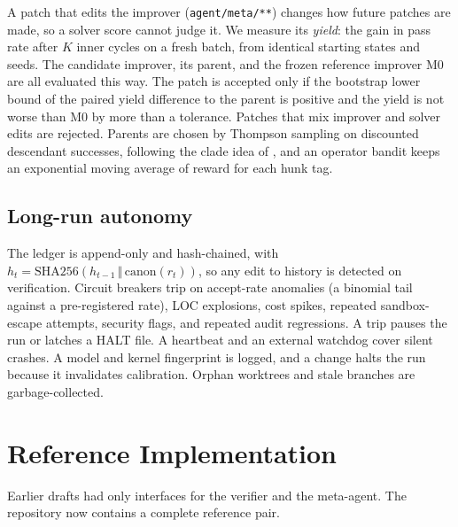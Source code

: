 \documentclass[11pt]{article}
\begin{document}
A patch that edits the improver (\texttt{agent/meta/**}) changes how future patches are made, so a solver score cannot judge it. We measure its \emph{yield}: the gain in pass rate after $K$ inner cycles on a fresh batch, from identical starting states and seeds.
The candidate improver, its parent, and the frozen reference improver M0 are all evaluated this way. The patch is accepted only if the bootstrap lower bound of the paired yield difference to the parent is positive and the yield is not worse than M0 by more than a tolerance.
Patches that mix improver and solver edits are rejected. Parents are chosen by Thompson sampling on discounted descendant successes, following the clade idea of \citet{wang2026hgm}, and an operator bandit keeps an exponential moving average of reward for each hunk tag.

\subsection{Long-run autonomy}
\label{sec:auto}

The ledger is append-only and hash-chained, with $h_t=\mathrm{SHA256}(h_{t-1}\,\Vert\,\mathrm{canon}(r_t))$, so any edit to history is detected on verification.
Circuit breakers trip on accept-rate anomalies (a binomial tail against a pre-registered rate), LOC explosions, cost spikes, repeated sandbox-escape attempts, security flags, and repeated audit regressions. A trip pauses the run or latches a HALT file.
A heartbeat and an external watchdog cover silent crashes. A model and kernel fingerprint is logged, and a change halts the run because it invalidates calibration. Orphan worktrees and stale branches are garbage-collected.

\section{Reference Implementation}
\label{sec:ref}

Earlier drafts had only interfaces for the verifier and the meta-agent. The repository now contains a complete reference pair.
\end{document}
